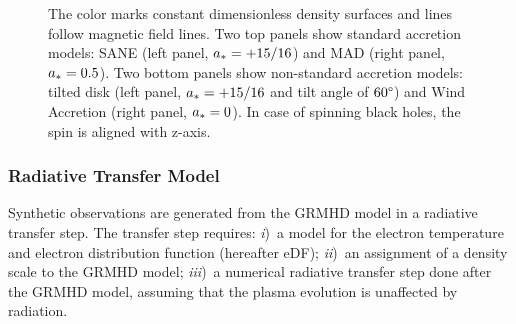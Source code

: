 \begin{figure}
{    The color marks constant dimensionless density surfaces and lines follow magnetic field lines.
    Two top panels show standard accretion models: SANE (left panel, $a_*=+15/16$) and MAD (right panel, $a_*=0.5$).
    Two bottom panels show non-standard accretion models: tilted disk (left panel, $a_*=+15/16$ and tilt angle of $60\degree$) and Wind Accretion (right panel, $a_*=0$).
    In case of spinning black holes, the spin is aligned with z-axis.
  }
  \label{fig:GRMHD}
\end{figure}

\subsubsection{Radiative Transfer Model}

Synthetic observations are generated from the GRMHD model in a radiative transfer step.
The transfer step requires: %
\emph{i})~a model for the electron temperature and electron distribution function (hereafter eDF);
\emph{ii})~an assignment of a density scale to the GRMHD model;
\emph{iii})~a numerical radiative transfer step done after the GRMHD model, assuming that the plasma evolution is unaffected by radiation.

